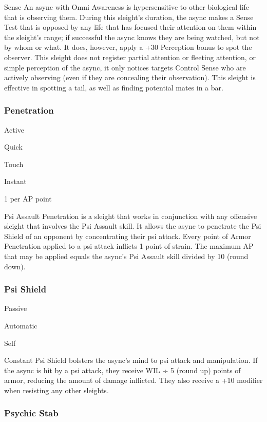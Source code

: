   

Sense
An async with Omni Awareness is hypersensitive to 
other biological life that is observing them. During 
this sleight's duration, the async makes a Sense Test 
that is opposed by any life that has focused their attention
on them within the sleight's range; if successful
the async knows they are being watched, but not
by whom or what. It does, however, apply a +30 Perception
bonus to spot the observer. This sleight does
not register partial attention or fleeting attention, or 
simple perception of the async, it only notices targets 
Control
Sense
who are actively observing (even if they are concealing 
their observation). This sleight is effective in spotting a 
tail, as well as finding potential mates in a bar.

\subsubsection{Penetration}


  

Active

   Quick

 Touch

   Instant

   1 per AP point

  

Psi Assault
Penetration is a sleight that works in conjunction with 
any offensive sleight that involves the Psi Assault skill. 
It allows the async to penetrate the Psi Shield of an opponent
by concentrating their psi attack. Every point
of Armor Penetration applied to a psi attack inflicts 
1 point of strain. The maximum AP that may be applied
equals the async's Psi Assault skill divided by 10
(round down).

\subsubsection{Psi Shield}


  

Passive

   Automatic

 Self

   Constant
Psi Shield bolsters the async's mind to psi attack and 
manipulation. If the async is hit by a psi attack, they 
receive WIL ÷ 5 (round up) points of armor, reducing 
the amount of damage inflicted. They also receive a 
+10 modifier when resisting any other sleights.

\subsubsection{Psychic Stab}


